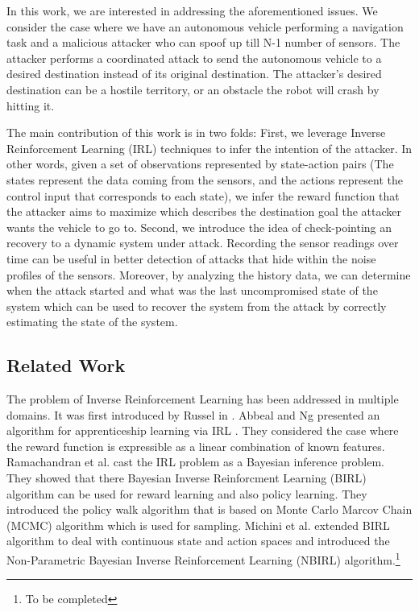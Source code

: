 \documentclass[conference]{IEEEtran}
\begin{document}
In this work, we are interested in addressing the aforementioned issues. We consider the case where we have an autonomous vehicle performing a navigation task and a malicious attacker who can spoof up till N-1 number of sensors. The attacker performs a coordinated attack to send the autonomous vehicle to a desired destination instead of its original destination. The attacker's desired destination can be a hostile territory, or an obstacle the robot will crash by hitting it.

The main contribution of this work is in two folds: First, we leverage Inverse Reinforcement Learning (IRL) techniques to infer the intention of the attacker. In other words, given a set of observations represented by state-action pairs (The states represent the data coming from the sensors, and the actions represent the control input that corresponds to each state), we infer the reward function that the attacker aims to maximize which describes the destination goal the attacker wants the vehicle to go to. Second, we introduce the idea of check-pointing an recovery to a dynamic system under attack. Recording the sensor readings over time can be useful in better detection of attacks that hide within the noise profiles of the sensors. Moreover, by analyzing the history data, we can determine when the attack started and what was the last uncompromised state of the system which can be used to recover the system from the attack by correctly estimating the state of the system.

\subsection{Related Work}\label{subsec:related}
The problem of Inverse Reinforcement Learning has been addressed in multiple domains. It was first introduced by Russel in \cite{Ng2000}. Abbeal and Ng presented an algorithm for apprenticeship learning via IRL  \cite{Abbeel2004a}. They considered the case where the reward function is expressible as a linear combination of known features. Ramachandran et al. \cite{Ramachandran2007} cast the IRL problem as a Bayesian inference problem. They showed that there Bayesian Inverse Reinforcment Learning (BIRL) algorithm can be used for reward learning and also policy learning. They introduced the policy walk algorithm that is based on Monte Carlo Marcov Chain (MCMC) algorithm which is used for sampling. Michini et al. \cite{Michini2015} extended BIRL algorithm to deal with continuous state and action spaces and introduced the Non-Parametric Bayesian Inverse Reinforcement Learning (NBIRL) algorithm.\footnote{To be completed}
\end{document}
